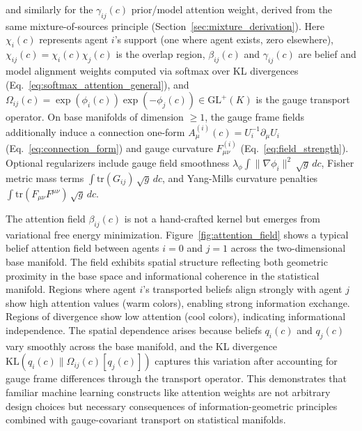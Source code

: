 \documentclass[11pt]{article}
\begin{document}
and similarly for the $\gamma_{ij}(c)$ prior/model attention weight, derived from the same mixture-of-sources principle (Section~\ref{sec:mixture_derivation}).
Here $\chi_i(c)$ represents agent $i$'s support (one where agent exists, zero elsewhere), $\chi_{ij}(c) = \chi_i(c) \chi_j(c)$ is the overlap region, $\beta_{ij}(c)$ and $\gamma_{ij}(c)$ are belief and model alignment weights computed via softmax over KL divergences (Eq.~\ref{eq:softmax_attention_general}), and $\Omega_{ij}(c) = \exp(\phi_i(c))\exp(-\phi_j(c)) \in \mathrm{GL}^+(K)$ is the gauge transport operator. On base manifolds of dimension $\geq 1$, the gauge frame fields additionally induce a connection one-form $A_\mu^{(i)}(c) = U_i^{-1}\partial_\mu U_i$ (Eq.~\ref{eq:connection_form}) and gauge curvature $F_{\mu\nu}^{(i)}$ (Eq.~\ref{eq:field_strength}). Optional regularizers include gauge field smoothness $\lambda_\phi \int \|\nabla \phi_i\|^2 \, \sqrt{g}\, dc$, Fisher metric mass terms $\int \mathrm{tr}(G_{ij}) \, \sqrt{g}\, dc$, and Yang-Mills curvature penalties $\int \mathrm{tr}(F_{\mu\nu} F^{\mu\nu}) \, \sqrt{g}\, dc$.

The attention field $\beta_{ij}(c)$ is not a hand-crafted kernel but emerges from variational free energy minimization. Figure~\ref{fig:attention_field} shows a typical belief attention field between agents $i=0$ and $j=1$ across the two-dimensional base manifold. The field exhibits spatial structure reflecting both geometric proximity in the base space and informational coherence in the statistical manifold. Regions where agent $i$'s transported beliefs align strongly with agent $j$ show high attention values (warm colors), enabling strong information exchange. Regions of divergence show low attention (cool colors), indicating informational independence. The spatial dependence arises because beliefs $q_i(c)$ and $q_j(c)$ vary smoothly across the base manifold, and the KL divergence $\mathrm{KL}(q_i(c) \| \Omega_{ij}(c)[q_j(c)])$ captures this variation after accounting for gauge frame differences through the transport operator. This demonstrates that familiar machine learning constructs like attention weights are not arbitrary design choices but necessary consequences of information-geometric principles combined with gauge-covariant transport on statistical manifolds.
\end{document}
